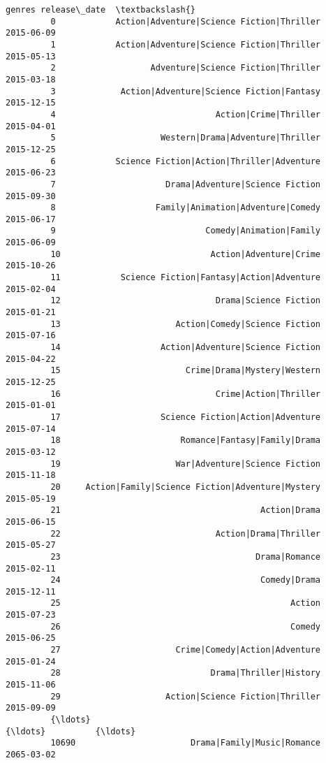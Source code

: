 \documentclass[11pt]{article}
\begin{document}
\begin{Verbatim}[commandchars=\\\{\}]
                                                         genres release\_date  \textbackslash{}
         0            Action|Adventure|Science Fiction|Thriller   2015-06-09   
         1            Action|Adventure|Science Fiction|Thriller   2015-05-13   
         2                   Adventure|Science Fiction|Thriller   2015-03-18   
         3             Action|Adventure|Science Fiction|Fantasy   2015-12-15   
         4                                Action|Crime|Thriller   2015-04-01   
         5                     Western|Drama|Adventure|Thriller   2015-12-25   
         6            Science Fiction|Action|Thriller|Adventure   2015-06-23   
         7                      Drama|Adventure|Science Fiction   2015-09-30   
         8                    Family|Animation|Adventure|Comedy   2015-06-17   
         9                              Comedy|Animation|Family   2015-06-09   
         10                              Action|Adventure|Crime   2015-10-26   
         11            Science Fiction|Fantasy|Action|Adventure   2015-02-04   
         12                               Drama|Science Fiction   2015-01-21   
         13                       Action|Comedy|Science Fiction   2015-07-16   
         14                    Action|Adventure|Science Fiction   2015-04-22   
         15                         Crime|Drama|Mystery|Western   2015-12-25   
         16                               Crime|Action|Thriller   2015-01-01   
         17                    Science Fiction|Action|Adventure   2015-07-14   
         18                        Romance|Fantasy|Family|Drama   2015-03-12   
         19                       War|Adventure|Science Fiction   2015-11-18   
         20     Action|Family|Science Fiction|Adventure|Mystery   2015-05-19   
         21                                        Action|Drama   2015-06-15   
         22                               Action|Drama|Thriller   2015-05-27   
         23                                       Drama|Romance   2015-02-11   
         24                                        Comedy|Drama   2015-12-11   
         25                                              Action   2015-07-23   
         26                                              Comedy   2015-06-25   
         27                       Crime|Comedy|Action|Adventure   2015-01-24   
         28                              Drama|Thriller|History   2015-11-06   
         29                     Action|Science Fiction|Thriller   2015-09-09   
         {\ldots}                                                {\ldots}          {\ldots}   
         10690                       Drama|Family|Music|Romance   2065-03-02   

\end{Verbatim}
\end{document}
